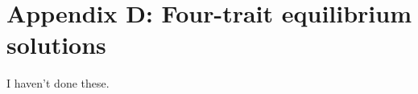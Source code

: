 \section*{Appendix D: Four-trait equilibrium solutions}

\renewcommand{\thefigure}{D\arabic{figure}}
\renewcommand{\theequation}{D\arabic{equation}}
\renewcommand{\thetable}{D\arabic{table}}
\setcounter{equation}{0}
\setcounter{figure}{0}
\setcounter{table}{0}



I haven't done these.

